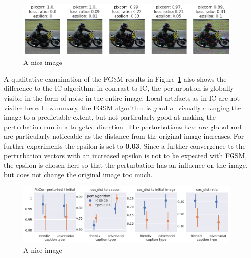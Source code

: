    \begin{figure}[ht]
        \centering
        \includegraphics[width=1\textwidth]{plots/advpert_fgsm_qual_validation_evolution.png}
        \caption{A nice image}\label{fig:advpert_fgsm_qual_validation_evolution}
    \end{figure}
    

A qualitative examination of the FGSM results in Figure~\ref{fig:advpert_fgsm_qual_validation_evolution} also shows the difference to the IC algorithm: in contrast to IC, the perturbation is globally visible in the form of noise in the entire image. Local artefacts as in IC are not visible here. In summary, the FGSM algorithm is good at visually changing the image to a predictable extent, but not particularly good at making the perturbation run in a targeted direction. The perturbations here are global and are particularly noticeable as the distance from the original image increases. For further experiments the epsilon is set to \textbf{0.03}. Since a further convergence to the perturbation vectors with an increased epsilon is not to be expected with FGSM, the epsilon is chosen here so that the perturbation has an influence on the image, but does not change the original image too much.


\begin{figure}[ht]
    \centering
    \includegraphics[width=1\textwidth]{plots/advpert_validation_chosen_perts.png}
    \caption{A nice image}\label{fig:advpert_validation_chosen_perts} %
\end{figure}
    
